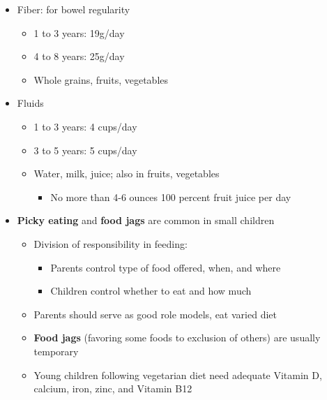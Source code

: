 \documentclass[12pt]{article}
\begin{document}
\begin{itemize}
\begin{itemize}
                    \end{itemize}
                \item Fiber: for bowel regularity
                    \begin{itemize}
                        \item 1 to 3 years: 19g/day
                        \item 4 to 8 years: 25g/day
                        \item Whole grains, fruits, vegetables
                    \end{itemize}
                \item Fluids
                    \begin{itemize}
                        \item 1 to 3 years: 4 cups/day
                        \item 3 to 5 years: 5 cups/day
                        \item Water, milk, juice; also in fruits, vegetables
                            \begin{itemize}
                                \item No more than 4-6 ounces 100 percent fruit juice per day
                            \end{itemize}
                    \end{itemize}
                \item \textbf{Picky eating} and \textbf{food jags} are common in small children
                    \begin{itemize}
                        \item Division of responsibility in feeding:
                            \begin{itemize}
                                \item Parents control type of food offered, when, and where
                                \item Children control whether to eat and how much
                            \end{itemize}
                        \item Parents should serve as good role models, eat varied diet
                        \item \textbf{Food jags} (favoring some foods to exclusion of others) are usually temporary
                        \item Young children following vegetarian diet need adequate Vitamin D, calcium, iron, zinc, and Vitamin B12
                    \end{itemize}
            \end{itemize}
            
\end{document}
